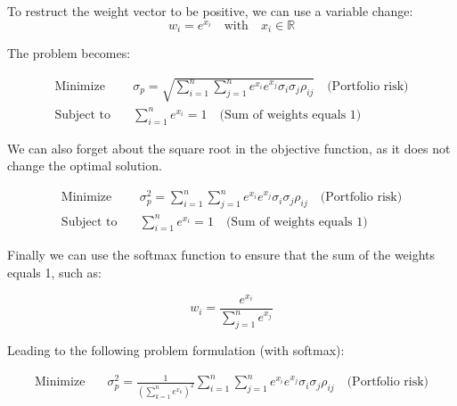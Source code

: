 \documentclass[12pt]{article}
\begin{document}

To restruct the weight vector to be positive, we can use a variable change:
\begin{equation}
    w_i = e^{x_i} \quad \text{with} \quad x_i \in \mathbb{R}
\end{equation}

The problem becomes:

\begin{equation}
    \begin{aligned}
        \text{Minimize} \quad   & \sigma_p = \sqrt{\sum_{i=1}^{n}\sum_{j=1}^{n} e^{x_i} e^{x_j} \sigma_i \sigma_j \rho_{ij}} \quad \text{(Portfolio risk)} \\
        \text{Subject to} \quad & \sum_{i=1}^{n} e^{x_i} = 1 \quad \text{(Sum of weights equals 1)}    
    \end{aligned}
\end{equation}

We can also forget about the square root in the objective function, as it does not change the optimal solution.

\begin{equation}
    \begin{aligned}
        \text{Minimize} \quad   & \sigma_p^2 = \sum_{i=1}^{n}\sum_{j=1}^{n} e^{x_i} e^{x_j}\sigma_i \sigma_j \rho_{ij} \quad \text{(Portfolio risk)} \\
        \text{Subject to} \quad & \sum_{i=1}^{n} e^{x_i} = 1 \quad \text{(Sum of weights equals 1)}    
    \end{aligned}
\end{equation}


Finally we can use the softmax function to ensure that the sum of the weights equals 1, such as:

\begin{equation}
    w_i = \frac{e^{x_i}}{\sum_{j=1}^{n} e^{x_j}}
\end{equation}

Leading to the following problem formulation (with softmax):

\begin{equation}
    \begin{aligned}
        \text{Minimize} \quad   & \sigma_p^2 = \frac{1}{(\sum_{k=1}^{n} e^{x_k})^{2}} \sum_{i=1}^{n}\sum_{j=1}^{n} e^{x_i} e^{x_j}\sigma_i \sigma_j \rho_{ij} \quad \text{(Portfolio risk)} \\
    \end{aligned}
\end{equation}
\end{document}
